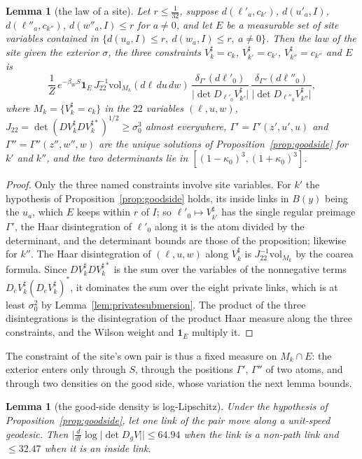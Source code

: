 \documentclass[11pt]{amsart}
\newtheorem{lemma}[theorem]{Lemma}
\theoremstyle{definition}
\theoremstyle{remark}
\numberwithin{equation}{section}
\begin{document}
\begin{lemma}[the law of a site]\label{lem:sitelaw}
Let $r\le\frac1{32}$, suppose $d(\ell'_a,c_{k'})$, $d(u'_a,I)$,
$d(\ell''_a,c_{k''})$, $d(w''_a,I)\le r$ for $a\ne0$, and let $E$ be a
measurable set of site variables contained in $\{d(u_a,I)\le r,\
d(w_a,I)\le r,\ a\ne0\}$. Then the law of the site given the exterior
$\sigma$, the three constraints $V^\sharp_k=c_k$, $V^\sharp_{k'}=c_{k'}$,
$V^\sharp_{k''}=c_{k''}$ and $E$ is
\[
\frac1Z\,e^{-\beta_WS}\mathbf 1_E\,J_{22}^{-1}\mathrm{vol}_{M_k}(d\ell\,du
\,dw)\,\frac{\delta_{\Gamma'}(d\ell'_0)}{\lvert\det D_{\ell'_0}V^\sharp_{k'}
\rvert}\,\frac{\delta_{\Gamma''}(d\ell''_0)}{\lvert\det D_{\ell''_0}
V^\sharp_{k''}\rvert},
\]
where $M_k=\{V^\sharp_k=c_k\}$ in the $22$ variables $(\ell,u,w)$, $J_{22}=
\det(DV^\sharp_kDV^{\sharp*}_k)^{1/2}\ge\sigma_0^3$ almost everywhere,
$\Gamma'=\Gamma'(z',u',u)$ and $\Gamma''=\Gamma''(z'',w'',w)$ are the
unique solutions of Proposition~\ref{prop:goodside} for $k'$ and $k''$, and
the two determinants lie in $[(1-\kappa_0)^3,(1+\kappa_0)^3]$.
\end{lemma}

\begin{proof}
Only the three named constraints involve site variables. For $k'$ the
hypothesis of Proposition~\ref{prop:goodside} holds, its inside links in
$B(y)$ being the $u_a$, which $E$ keeps within $r$ of $I$; so
$\ell'_0\mapsto V^\sharp_{k'}$ has the single regular preimage $\Gamma'$,
the Haar disintegration of $\ell'_0$ along it is the atom divided by the
determinant, and the determinant bounds are those of the proposition;
likewise for $k''$. The Haar disintegration of $(\ell,u,w)$ along
$V^\sharp_k$ is $J_{22}^{-1}\mathrm{vol}_{M_k}$ by the coarea formula.
Since $DV^\sharp_kDV^{\sharp*}_k$ is the sum over the variables of the
nonnegative terms $D_eV^\sharp_k(D_eV^\sharp_k)^*$, it dominates the sum
over the eight private links, which is at least $\sigma_0^2$ by
Lemma~\ref{lem:privatesubmersion}. The product of the three
disintegrations is the disintegration of the product Haar measure along
the three constraints, and the Wilson weight and $\mathbf 1_E$ multiply it.
\end{proof}

The constraint of the site's own pair is thus a fixed measure on
$M_k\cap E$: the exterior enters only through $S$, through the positions
$\Gamma'$, $\Gamma''$ of two atoms, and through two densities on the good
side, whose variation the next lemma bounds.

\begin{lemma}[the good-side density is log-Lipschitz]\label{lem:goodsidedensity}
Under the hypothesis of Proposition~\ref{prop:goodside}, let one link of
the pair move along a unit-speed geodesic. Then
$\bigl|\frac d{dt}\log\lvert\det D_gV\rvert\bigr|\le64.94$ when the link
is a non-path link and $\le32.47$ when it is an inside link.
\end{lemma}
\end{document}
